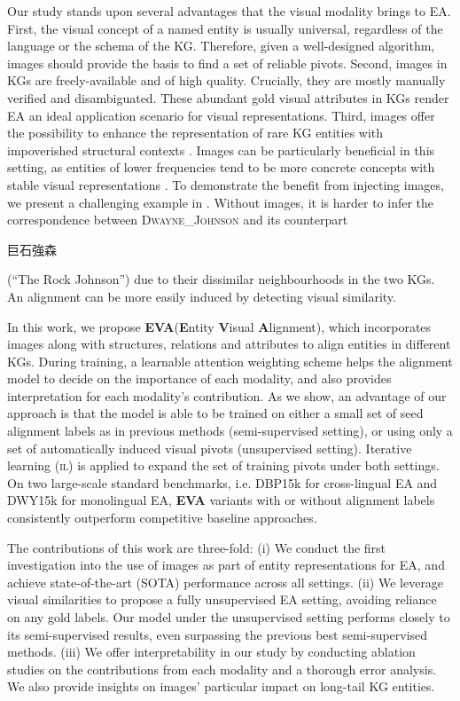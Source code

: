 \documentclass[letterpaper]{article} \usepackage{aaai21}  \usepackage{times}  \usepackage{helvet} \usepackage{courier}  \usepackage[hyphens]{url}  \usepackage{graphicx} \urlstyle{rm} \def\UrlFont{\rm}  \usepackage{natbib}  \usepackage{caption} \frenchspacing  \setlength{\pdfpagewidth}{8.5in}  \setlength{\pdfpageheight}{11in}
\newcommand{\modelname}[0]{\textbf{\textsc{EVA}}\xspace}
\begin{document}
Our study stands upon several advantages that the visual modality brings to EA.
First, the visual concept of a named entity is usually universal, regardless of the language or the schema of the KG. Therefore,
given a well-designed algorithm, images should provide the basis to find a set of reliable pivots.
Second, images in KGs are freely-available and of high quality. Crucially, they are mostly manually verified and disambiguated. These abundant gold visual attributes in KGs render EA an ideal application scenario for visual representations. 
Third, images offer the possibility to enhance the representation of rare KG entities with impoverished structural contexts \citep{cao2020open,xiong2018one,hao2019joie}.
Images can be particularly beneficial in this setting, as entities of lower frequencies tend to be more concrete concepts \citep{hessel2018quantifying} with stable visual representations \citep{kiela2014improving,hewitt2018learning}. To demonstrate the benefit from injecting images,
we present a challenging example in  . Without images, it is harder to infer the correspondence between \textsc{Dwayne\_Johnson} and its counterpart \begin{CJK*}{UTF8}{bsmi}巨石強森\end{CJK*} (``The Rock Johnson'') due to their dissimilar
neighbourhoods in the two KGs.
An alignment can be more easily induced by detecting visual similarity.


In this work, 
we propose \modelname (\textbf{\textsc{E}}ntity \textbf{\textsc{V}}isual \textbf{\textsc{A}}lignment), which incorporates 
images along with structures, relations and attributes to align entities in different KGs. During training, a learnable attention weighting scheme helps the alignment model to decide on the importance of each modality, and also provides interpretation for each modality's contribution.
As we show, an advantage of our approach is that the model is able to be trained on either a small set of seed alignment labels as in previous methods 
(semi-supervised setting), or using only a set of automatically induced visual pivots (unsupervised setting). Iterative learning (\textsc{il}) is applied to expand the set of training pivots under both settings. 
On two large-scale standard benchmarks, i.e. DBP15k 
for cross-lingual EA and DWY15k for monolingual EA,
\modelname variants with or without alignment labels consistently outperform competitive baseline approaches. 

The contributions of this work are three-fold: (i) We conduct the first investigation into the use of images as part of entity representations for EA, and achieve state-of-the-art (SOTA) performance across all settings. (ii) We leverage visual similarities to propose a fully unsupervised EA setting, avoiding reliance on any gold labels. Our model under the unsupervised setting performs closely to its semi-supervised results, even surpassing the previous best semi-supervised methods. 
(iii) We offer interpretability in our study by conducting ablation studies on the contributions from each modality and a thorough error analysis. We also provide insights on images' particular impact on long-tail KG entities. 
\end{document}
